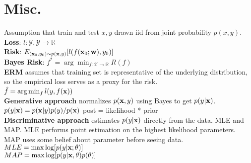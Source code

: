 \section{Misc.}
Assumption that train and test $x,y$ drawn iid from joint probability $p(x,y)$.\\
\textbf{Loss}: $l: \mathcal{Y}, \mathcal{Y} \to \mathbb{R}$\\
\textbf{Risk}: $E_{({\textrm{\textbf{x}}}_0,y_0)\sim p({\textrm{\textbf{x}}},y)}[l(f({\textrm{\textbf{x}}}_0; {\textrm{\textbf{w}}}), y_0)]$\\
\textbf{Bayes Risk}:
$f^*  = \arg\min_{f:\mathcal{X}\to \mathbb{R}} R(f)$\\
\textbf{ERM} assumes that training set is representative of the underlying distribution, so the empirical loss serves as a proxy for the risk.\\
$\hat{f} = \arg\min_f l(y, f({\textrm{\textbf{x}}}))$\\
\textbf{Generative approach} normalizes $p({\textrm{\textbf{x}}},y)$ using Bayes to get $p(y|{\textrm{\textbf{x}}})$.\\
$p(y|{\textrm{\textbf{x}}}) = p({\textrm{\textbf{x}}}|y)p(y)/p({\textrm{\textbf{x}}})$ post = likelihood * prior\\
\textbf{Discriminative approach} estimates $p(y|{\textrm{\textbf{x}}})$ directly from the data. MLE and MAP. MLE performs point estimation on the highest likelihood parameters. MAP uses some belief about parameter before seeing data.\\
$MLE = \max \log [p(y|{\textrm{\textbf{x}}}; \theta)]$\\
$MAP = \max \log [p(y|{\textrm{\textbf{x}}}, \theta)p(\theta)]$
